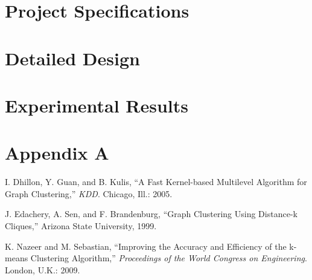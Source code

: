 \documentclass[12pt]{article}
\begin{document}
\newpage
\section{Project Specifications}

\newpage
\section{Detailed Design}

\newpage
\section{Experimental Results}


\newpage
\section{Appendix A}


\newpage
\begin{thebibliography}{9}

I. Dhillon, Y. Guan, and B. Kulis, ``A Fast Kernel-based Multilevel Algorithm for Graph Clustering,'' \textit{KDD}. Chicago, Ill.: 2005.
 
J. Edachery, A. Sen, and F. Brandenburg, ``Graph Clustering Using Distance-k Cliques,'' Arizona State University, 1999.
 
K. Nazeer and M. Sebastian, ``Improving the Accuracy and Efficiency of the k-means Clustering Algorithm,'' 
\textit{Proceedings of the World Congress on Engineering}. London, U.K.: 2009.

\end{thebibliography}

\begin{comment}
\begin{figure}[!htb]
\begin{center}
	\texttt{[image: puppy.png]}
	\caption{T-Test for Relative Fitness with Parsimony Pressures 0.2 and 0.3}
	\label{tTestMLR}
\end{center}
\end{figure}
\end{comment}
\end{document}

